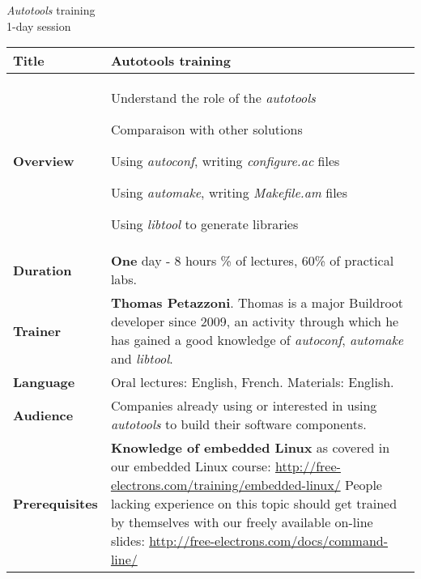 \documentclass[a4paper,12pt,obeyspaces,spaces,hyphens]{article}
\begin{document}
\thispagestyle{fancy}

\setlength{\arrayrulewidth}{0.8pt}

\begin{center}
\LARGE
{\em Autotools} training\\
\large
1-day session
\end{center}
\vspace{1cm}

\small
{}

 {
  \begin{tabularx}{\textwidth}{|g|h|}
    {\bf Title} & {\bf Autotools training} \\
    \hline

    {\bf Overview} &
    Understand the role of the {\em autotools} \par
    Comparaison with other solutions \par
    Using {\em autoconf}, writing {\em configure.ac} files \par
    Using {\em automake}, writing {\em Makefile.am} files \par
    Using {\em libtool} to generate libraries \\
    \hline

    {\bf Duration} & {\bf One} day - 8 hours
    \% of lectures, 60\% of practical labs. \\
    \hline

    {\bf Trainer} & {\bf Thomas Petazzoni}. Thomas is a major
    Buildroot developer since 2009, an activity through which he has
    gained a good knowledge of {\em autoconf}, {\em automake} and {\em
      libtool}.\\
    \hline

    {\bf Language} & Oral lectures: English, French.
    \newline Materials: English.\\
    \hline

    {\bf Audience} & Companies already using or interested in using
    {\em autotools} to build their software components.\\
    \hline

    {\bf Prerequisites} & {\bf Knowledge of embedded Linux} as covered
    in our embedded Linux course:
    \newline \url{http://free-electrons.com/training/embedded-linux/} \vspace{1em}
    \newline People lacking experience on this topic should get
    trained by themselves with our freely available on-line slides:
    \newline \url{http://free-electrons.com/docs/command-line/} \\
    \hline
  \end{tabularx}

}
\end{document}
